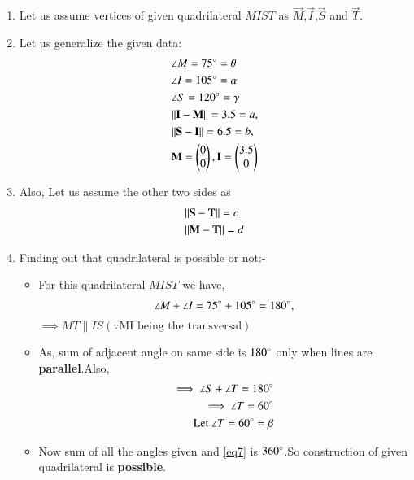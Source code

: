 \documentclass[journal,12pt,twocolumn]{IEEEtran}
\begin{document}
\begin{enumerate}
\item Let us assume vertices of given quadrilateral $MIST$ as $\vec{M}$,$\vec{I}$,$\vec{S}$ and $\vec{T}$.

\item Let us generalize the given data:
    \begin{align}
    &\angle M= 75\degree=\theta \label{eq1}
    \\
    &\angle I= 105\degree=\alpha
    \\
    &\angle S= 120\degree=\gamma \label{eq2}
    \\
    &\Vert\mathbf{I}-\mathbf{M}\rVert =3.5=a, \label{eq3}
    \\
    &\Vert\mathbf{S}-\mathbf{I}\rVert =6.5=b,\label{eq4}
    \\
    &\mathbf{M}=\begin{pmatrix}0\\0\end{pmatrix}, \mathbf{I}=\begin{pmatrix}3.5\\0\end{pmatrix}
    \end{align}
\item Also, Let us assume the other two sides as
\begin{align}
 &\Vert\mathbf{S}-\mathbf{T}\rVert=c \label{eq5}
 \\
  &\Vert\mathbf{M}-\mathbf{T}\rVert =d \label{eq6}
\end{align}  
\item Finding out that quadrilateral is possible or not:-
\begin{itemize}
\item For this quadrilateral $MIST$ we have,
\begin{align}
\angle M +\angle I = 75\degree + 105\degree =180\degree,
\end{align}
$ \implies MT \parallel IS (\because \text {MI being the transversal})$
\\
\item As, sum of adjacent angle on same side is $180\degree$ only when lines are \textbf{parallel}.Also,
\begin{align}
\implies \angle S + \angle T = 180\degree 
\\
\implies \angle T = 60\degree 
\\
\text{Let }\angle T = 60\degree =\beta \label{eq7}
\end{align}
\item Now sum of all the angles given and \eqref{eq7} is $360\degree$.So construction of given quadrilateral is \textbf{possible}.
\end{itemize}
\begin{lemma}

\end{lemma}
\end{enumerate}
\end{document}
